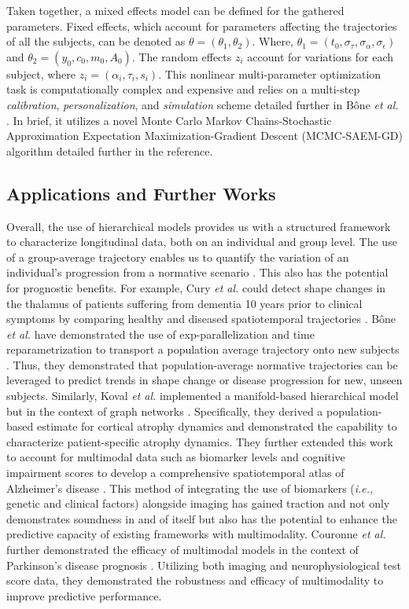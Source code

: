 				Taken together, a mixed effects model can be defined for the gathered parameters.
				Fixed effects, which account for parameters affecting the trajectories of all the subjects, can be denoted as $\theta = (\theta_{1}, \theta_{2})$. Where, $\theta_{1} = (t_{0}, \sigma_{\tau}, \sigma_{\alpha}, \sigma_{\epsilon})$ and $\theta_{2} = (y_{0}, c_{0}, m_{0}, A_{0})$. The random effects $z_{i}$ account for variations for each subject, where $z_{i} = (\alpha_{i}, \tau_{i}, s_{i})$. This nonlinear multi-parameter optimization task is computationally complex and expensive and relies on a multi-step \textit{calibration}, \textit{personalization}, and \textit{simulation} scheme detailed further in Bône \textit{et al.} \cite{Bne2020}. In brief, it utilizes a novel Monte Carlo Markov Chains-Stochastic Approximation Expectation Maximization-Gradient Descent (MCMC-SAEM-GD) algorithm detailed further in the reference. 

				\subsection{Applications and Further Works}
				
					Overall, the use of hierarchical models provides us with a structured framework to characterize longitudinal data, both on an individual and group level. The use of a group-average trajectory enables us to quantify the variation of an individual's progression from a normative scenario \cite{Kim2017}. This also has the potential for prognostic benefits. For example, Cury \textit{et al.} could detect shape changes in the thalamus of patients suffering from dementia 10 years prior to clinical symptoms by comparing healthy and diseased spatiotemporal trajectories \cite{Cury2016}. Bône \textit{et al.} have demonstrated the use of exp-parallelization and time reparametrization to transport a population average trajectory onto new subjects \cite{Bne2017}. Thus, they demonstrated that population-average normative trajectories can be leveraged to predict trends in shape change or disease progression for new, unseen subjects. Similarly, Koval \textit{et al.} implemented a manifold-based hierarchical model but in the context of graph networks \cite{Koval2018}. Specifically, they derived a population-based estimate for cortical atrophy dynamics and demonstrated the capability to characterize patient-specific atrophy dynamics. They further extended this work to account for multimodal data such as biomarker levels and cognitive impairment scores to develop a comprehensive spatiotemporal atlas of Alzheimer's disease \cite{Koval2021}. This method of integrating the use of biomarkers (\textit{i.e.,} genetic and clinical factors) alongside imaging has gained traction and not only demonstrates soundness in and of itself \cite{Dalca2015} but also has the potential to enhance the predictive capacity of existing frameworks with multimodality. Couronne \textit{et al.} further demonstrated the efficacy of multimodal models in the context of Parkinson's disease prognosis \cite{Couronne2019}. Utilizing both imaging and neurophysiological test score data, they demonstrated the robustness and efficacy of multimodality to improve predictive performance.
					

